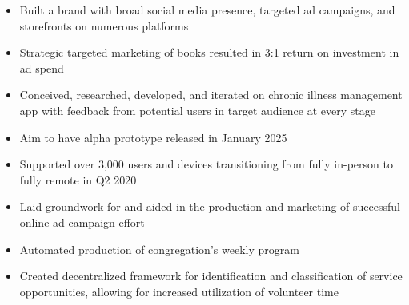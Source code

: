 \par\smallskip
\noindent
\begin{minipage}{20cm}
  \begin{minipage}{9.75cm}
    \begin{itemize}
      \item Built a brand with broad social media presence, targeted
            ad campaigns, and storefronts on numerous platforms
      \item Strategic targeted marketing of books resulted in 3:1
            return on investment in ad spend
    \end{itemize}
  \end{minipage}
  \hfill
  \begin{minipage}{9.75cm}
    \begin{itemize}
      \item Conceived, researched, developed, and iterated on
            chronic illness management app with feedback from
            potential users in target audience at every stage
      \item Aim to have alpha prototype released in January 2025
    \end{itemize}
  \end{minipage}
\end{minipage}
\par\smallskip
\divider

\par\smallskip
\noindent
\begin{minipage}{20cm}
  \begin{minipage}{9.75cm}
    \begin{itemize}
      \item Supported over 3,000 users and devices transitioning
            from fully in-person to fully remote in Q2 2020
      \item Laid groundwork for and aided in the production and
            marketing of successful online ad campaign effort
    \end{itemize}
  \end{minipage}
  \hfill
  \begin{minipage}{9.75cm}

    \begin{itemize}
      \item Automated production of congregation’s weekly program
      \item Created decentralized framework for identification and
            classification of service opportunities, allowing for
            increased utilization of volunteer time
    \end{itemize}
  \end{minipage}
\end{minipage}

